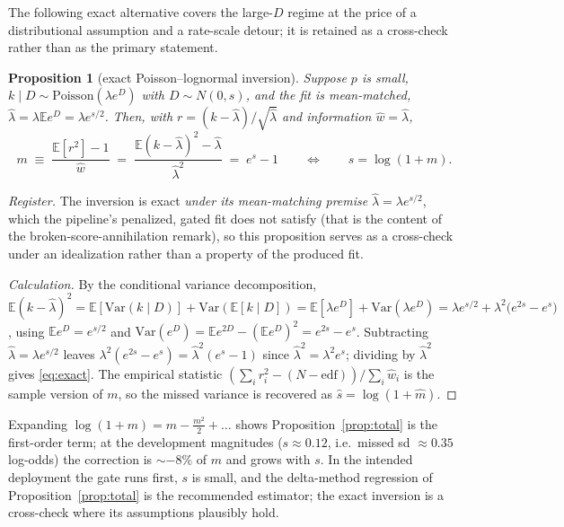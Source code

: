 \documentclass[11pt]{article}
\newtheorem{proposition}{Proposition}[section]
\newcommand{\E}{\mathbb{E}}
\newcommand{\Var}{\mathrm{Var}}
\begin{document}
The following exact alternative covers the large-$D$ regime at the price of a
distributional assumption and a rate-scale detour; it is retained as a cross-check
rather than as the primary statement.

\begin{proposition}[exact Poisson--lognormal inversion]\label{prop:lognormal}
Suppose $p$ is small, $k\mid D\sim\mathrm{Poisson}(\lambda e^{D})$ with
$D\sim N(0,s)$, and the fit is mean-matched, $\hat\lambda=\lambda\E e^{D}=\lambda
e^{s/2}$. Then, with $r=(k-\hat\lambda)/\sqrt{\hat\lambda}$ and information
$\hat w=\hat\lambda$,
\begin{equation}\label{eq:exact}
m \;\equiv\; \frac{\E[r^2]-1}{\hat w}
\;=\; \frac{\E (k-\hat\lambda)^2-\hat\lambda}{\hat\lambda^{2}}
\;=\; e^{s}-1
\qquad\Longleftrightarrow\qquad
s=\log(1+m).
\end{equation}
\end{proposition}

\emph{Register.} The inversion is exact \emph{under its mean-matching premise}
$\hat\lambda=\lambda e^{s/2}$, which the pipeline's penalized, gated fit does
not satisfy (that is the content of the broken-score-annihilation remark), so
this proposition serves as a cross-check under an idealization rather than a
property of the produced fit.
\begin{proof}[Calculation]
By the conditional variance decomposition,
$\E(k-\hat\lambda)^2=\E[\Var(k\mid D)]+\Var(\E[k\mid D])
=\E[\lambda e^{D}]+\Var(\lambda e^{D})
=\lambda e^{s/2}+\lambda^2\bigl(e^{2s}-e^{s}\bigr)$,
using $\E e^{D}=e^{s/2}$ and $\Var(e^{D})=\E e^{2D}-(\E e^{D})^2=e^{2s}-e^{s}$.
Subtracting $\hat\lambda=\lambda e^{s/2}$ leaves
$\lambda^2(e^{2s}-e^{s})=\hat\lambda^{2}(e^{s}-1)$ since
$\hat\lambda^{2}=\lambda^{2}e^{s}$; dividing by $\hat\lambda^{2}$ gives
\eqref{eq:exact}. The empirical statistic
$(\sum_i r_i^2-(N-\mathrm{edf}))/\sum_i\hat w_i$ is the sample version of $m$, so the
missed variance is recovered as $\hat s=\log(1+\hat m)$.
\end{proof}
Expanding $\log(1+m)=m-\tfrac{m^2}{2}+\dots$ shows Proposition~\ref{prop:total} is the
first-order term; at the development magnitudes ($s\approx0.12$, i.e.\ missed sd
$\approx0.35$ log-odds) the correction is $\sim -8\%$ of $m$ and grows with $s$. In the
intended deployment the gate runs first, $s$ is small, and the delta-method
regression of Proposition~\ref{prop:total} is the recommended estimator; the exact
inversion is a cross-check where its assumptions plausibly hold.
\end{document}
